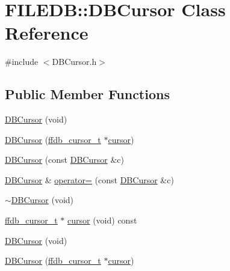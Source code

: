 \hypertarget{classFILEDB_1_1DBCursor}{}\section{F\+I\+L\+E\+DB\+:\+:D\+B\+Cursor Class Reference}
\label{classFILEDB_1_1DBCursor}


{\ttfamily \#include $<$D\+B\+Cursor.\+h$>$}

\subsection*{Public Member Functions}
\begin{DoxyCompactItemize}
\item 
\mbox{\hyperlink{classFILEDB_1_1DBCursor_aba0d95e9eb892acd1722ca46e481459d}{D\+B\+Cursor}} (void)
\item 
\mbox{\hyperlink{classFILEDB_1_1DBCursor_aaa004d2a0c3ddb6b8df9f31600c29a3b}{D\+B\+Cursor}} (\mbox{\hyperlink{adat-devel_2other__libs_2filedb_2filehash_2ffdb__db_8h_a1383f6fb3966b0ca74206ba93b687fd9}{ffdb\+\_\+cursor\+\_\+t}} $\ast$\mbox{\hyperlink{classFILEDB_1_1DBCursor_a9e5b4a386c6f27bc1eb67714117e1e6d}{cursor}})
\item 
\mbox{\hyperlink{classFILEDB_1_1DBCursor_ae65ab90dc14febbbfa277bfd0e1533db}{D\+B\+Cursor}} (const \mbox{\hyperlink{classFILEDB_1_1DBCursor}{D\+B\+Cursor}} \&c)
\item 
\mbox{\hyperlink{classFILEDB_1_1DBCursor}{D\+B\+Cursor}} \& \mbox{\hyperlink{classFILEDB_1_1DBCursor_a2344830ead72e3005aa60545eb4fef00}{operator=}} (const \mbox{\hyperlink{classFILEDB_1_1DBCursor}{D\+B\+Cursor}} \&c)
\item 
\mbox{\hyperlink{classFILEDB_1_1DBCursor_a8c6c1bdf4c4279ab3e0d980e800c3542}{$\sim$\+D\+B\+Cursor}} (void)
\item 
\mbox{\hyperlink{adat-devel_2other__libs_2filedb_2filehash_2ffdb__db_8h_a1383f6fb3966b0ca74206ba93b687fd9}{ffdb\+\_\+cursor\+\_\+t}} $\ast$ \mbox{\hyperlink{classFILEDB_1_1DBCursor_a9e5b4a386c6f27bc1eb67714117e1e6d}{cursor}} (void) const
\item 
\mbox{\hyperlink{classFILEDB_1_1DBCursor_aba0d95e9eb892acd1722ca46e481459d}{D\+B\+Cursor}} (void)
\item 
\mbox{\hyperlink{classFILEDB_1_1DBCursor_aaa004d2a0c3ddb6b8df9f31600c29a3b}{D\+B\+Cursor}} (\mbox{\hyperlink{adat-devel_2other__libs_2filedb_2filehash_2ffdb__db_8h_a1383f6fb3966b0ca74206ba93b687fd9}{ffdb\+\_\+cursor\+\_\+t}} $\ast$\mbox{\hyperlink{classFILEDB_1_1DBCursor_a9e5b4a386c6f27bc1eb67714117e1e6d}{cursor}})

\end{DoxyCompactItemize}
